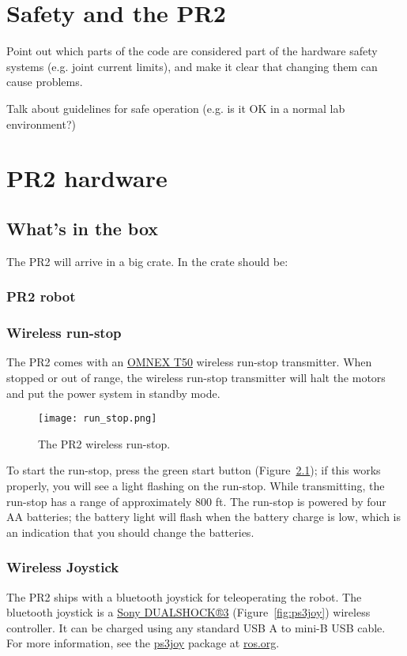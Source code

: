 \chapter{Safety and the PR2}
Point out which parts of the code are considered part of the hardware safety systems (e.g. joint current limits), and make it clear that changing them can cause problems.

Talk about guidelines for safe operation (e.g. is it OK in a normal lab environment?)

\chapter{PR2 hardware}

\section{What's in the box}
The PR2 will arrive in a big crate.  In the crate should be:
\subsection{PR2 robot}
\subsection{Wireless run-stop}
\label{wirelessrunstop}
The PR2 comes with an \href{http://www.omnexcontrols.com/products/portable/t50.html}{OMNEX T50} 
wireless run-stop transmitter. When stopped or out of range, the wireless run-stop transmitter will halt the motors and put the power system in standby mode. 

\begin{figure}[h]
\centering
\texttt{[image: run\_stop.png]}
\caption{The PR2 wireless run-stop.}
\label{fig:runstop}
\end{figure}

To start the run-stop, press the green start button (Figure~\ref{fig:runstop}); if this works properly, you will see a 
light flashing on the run-stop. While transmitting, the run-stop has a range of approximately 800 ft. The run-stop is powered by four AA batteries; the battery light will flash when the battery charge is low, which is an indication that you should change the batteries.

\subsection{Wireless Joystick}
The PR2 ships with a bluetooth joystick for teleoperating the robot. The bluetooth joystick is a 
\href{http://www.sonystyle.com/webapp/wcs/stores/servlet/ProductDisplay?catalogId=10551&storeId=10151&langId=-1&productId=8198552921665411965#additionalImage1%22}{Sony DUALSHOCK®3} (Figure~\ref{fig:ps3joy}) 
wireless controller. It can be charged using any standard USB A to mini-B USB cable. For more information, see the 
\href{http://www.ros.org/wiki/ps3joy}{ps3joy} package at \href{http://www.ros.org}{ros.org}.

